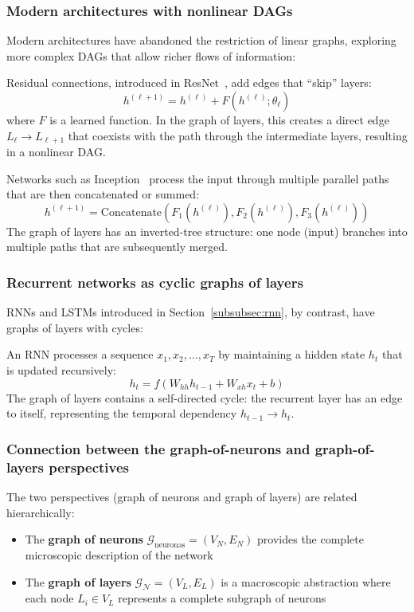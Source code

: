 \subsubsection[Modern architectures with nonlinear DAGs]{Modern architectures with nonlinear \glspl{DAG}}

Modern architectures have abandoned the restriction of linear graphs, exploring more complex \glspl{DAG} that allow richer flows of information:

Residual connections, introduced in ResNet~\citep{he2016deep}, add edges that ``skip'' layers:
\[
h^{(\ell+1)} = h^{(\ell)} + F(h^{(\ell)}; \theta_\ell)
\]
where $F$ is a learned function. In the graph of layers, this creates a direct edge $L_\ell \to L_{\ell+1}$ that coexists with the path through the intermediate layers, resulting in a nonlinear \gls{DAG}.

Networks such as Inception~\citep{szegedy2015going} process the input through multiple parallel paths that are then concatenated or summed:
\[
h^{(\ell+1)} = \text{Concatenate}(F_1(h^{(\ell)}), F_2(h^{(\ell)}), F_3(h^{(\ell)}))
\]
The graph of layers has an inverted-tree structure: one node (input) branches into multiple paths that are subsequently merged.

\subsubsection{Recurrent networks as cyclic graphs of layers}

\glspl{RNN} and \glspl{LSTM} introduced in Section~\ref{subsubsec:rnn}, by contrast, have graphs of layers with cycles:

\begin{example}
An \gls{RNN} processes a sequence $x_1, x_2, \ldots, x_T$ by maintaining a hidden state $h_t$ that is updated recursively:
\[
h_t = f(W_{hh} h_{t-1} + W_{xh} x_t + b)
\]
The graph of layers contains a self-directed cycle: the recurrent layer has an edge to itself, representing the temporal dependency $h_{t-1} \to h_t$.
\end{example}

\subsubsection{Connection between the graph-of-neurons and graph-of-layers perspectives}

The two perspectives (graph of neurons and graph of layers) are related hierarchically:
\begin{itemize}
    \item The \textbf{graph of neurons} $\mathcal{G}_{\text{neuronas}} = (V_N, E_N)$ provides the complete microscopic description of the network
    \item The \textbf{graph of layers} $\mathcal{G}_{\mathcal{N}} = (V_L, E_L)$ is a macroscopic abstraction where each node $L_i \in V_L$ represents a complete subgraph of neurons
\end{itemize}

